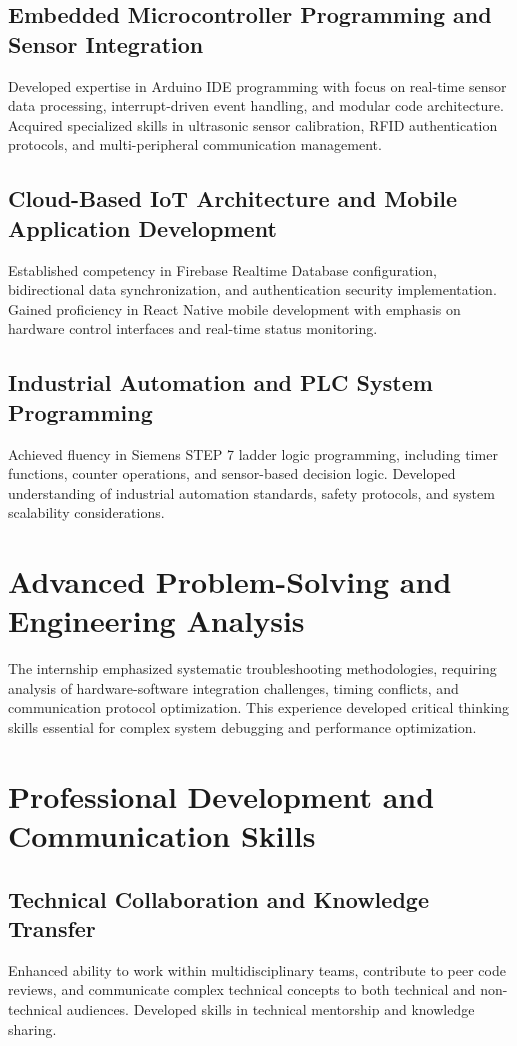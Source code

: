 \documentclass[12pt,a4paper]{report}
\begin{document}
\subsection{Embedded Microcontroller Programming and Sensor Integration}
\noindent Developed expertise in Arduino IDE programming with focus on real-time sensor data processing, interrupt-driven event handling, and modular code architecture. Acquired specialized skills in ultrasonic sensor calibration, RFID authentication protocols, and multi-peripheral communication management.

\subsection{Cloud-Based IoT Architecture and Mobile Application Development}
\noindent Established competency in Firebase Realtime Database configuration, bidirectional data synchronization, and authentication security implementation. Gained proficiency in React Native mobile development with emphasis on hardware control interfaces and real-time status monitoring.

\subsection{Industrial Automation and PLC System Programming}
\noindent Achieved fluency in Siemens STEP 7 ladder logic programming, including timer functions, counter operations, and sensor-based decision logic. Developed understanding of industrial automation standards, safety protocols, and system scalability considerations.

\section{Advanced Problem-Solving and Engineering Analysis}

\noindent The internship emphasized systematic troubleshooting methodologies, requiring analysis of hardware-software integration challenges, timing conflicts, and communication protocol optimization. This experience developed critical thinking skills essential for complex system debugging and performance optimization.

\section{Professional Development and Communication Skills}

\subsection{Technical Collaboration and Knowledge Transfer}
\noindent Enhanced ability to work within multidisciplinary teams, contribute to peer code reviews, and communicate complex technical concepts to both technical and non-technical audiences. Developed skills in technical mentorship and knowledge sharing.
\end{document}
